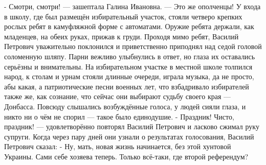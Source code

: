 - Смотри, смотри! --- зашептала Галина Ивановна. --- Это же ополченцы! У входа в школу, где был размещён избирательный участок, стояли четверо крепких рослых ребят в камуфляжной форме с автоматами. Оружие ребята держали, как младенцев, на обеих руках, прижав к груди.
Проходя мимо ребят, Василий Петрович уважительно поклонился и приветственно приподнял над седой головой соломенную шляпу. Парни вежливо улыбнулись в ответ, но глаза их оставались серьёзны и внимательны.
На избирательном участке в местной школе толпился народ, к столам  и урнам стояли длинные очереди, играла музыка, да не просто, абы какая, а патриотические песни военных лет, что взбадривало избирателей также же, как сознание, что сейчас они выбирают судьбу своего края --- Донбасса. Повсюду  слышались возбуждённые голоса, у людей сияли глаза, и никто ни о чём не спорил --- такое было единодушие.
- Праздник! Чисто, праздник! --- удовлетворённо повторял Василий Петрович и ласково сжимал руку супруги.
Когда через пару дней они узнали о результатах голосования, Василий Петрович сказал:
- Ну, мать, новая жизнь начинается, без этой хунтовой Украины. Сами себе хозяева теперь. Только всё-таки, где второй референдум?

